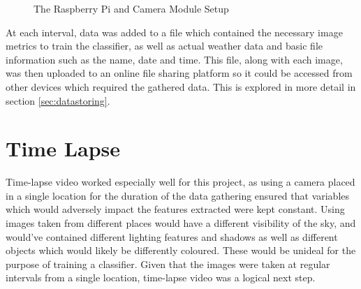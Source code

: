\documentclass[a4paper,12pt,twoside]{report}
\begin{document}
\begin{figure}[H]
 \centering
 \caption{The Raspberry Pi and Camera Module Setup} 
\end{figure}

At each interval, data was added to a file which contained the necessary image metrics to train the classifier, as well as actual weather data and basic file information such as the name, date and time.
This file, along with each image, was then uploaded to an online file sharing platform so it could be accessed from other devices which required the gathered data. This is explored in more detail in section \ref{sec:datastoring}.

\section{Time Lapse}
Time-lapse video worked especially well for this project, as using a camera placed in a single location for the duration of the data gathering ensured that variables which would adversely impact the features extracted were kept constant. Using images taken from different places would have a different visibility of the sky, and would've contained different lighting features and shadows as well as different objects which would likely be differently coloured. These would be unideal for the purpose of training a classifier.
Given that the images were taken at regular intervals from a single location, time-lapse video was a logical next step.
\end{document}
